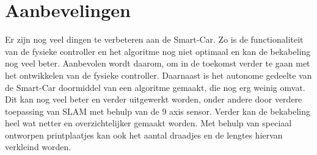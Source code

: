 \section{Aanbevelingen}
Er zijn nog veel dingen te verbeteren aan de \gls{Smart-Car}. Zo is de functionaliteit van de fysieke controller en het algoritme nog niet optimaal en kan de bekabeling nog veel beter. 
Aanbevolen wordt daarom, om in de toekomst verder te gaan met het ontwikkelen van de fysieke controller. Daarnaast is het autonome gedeelte van de \gls{Smart-Car} doormiddel van een algoritme gemaakt, die nog erg weinig omvat. Dit kan nog veel beter en verder uitgewerkt worden, onder andere door verdere toepassing van \gls{SLAM} met behulp van de 9 axis sensor. Verder kan de bekabeling heel wat netter en overzichtelijker gemaakt worden. Met behulp van speciaal ontworpen printplaatjes kan ook het aantal draadjes en de lengtes hiervan verkleind worden. 
